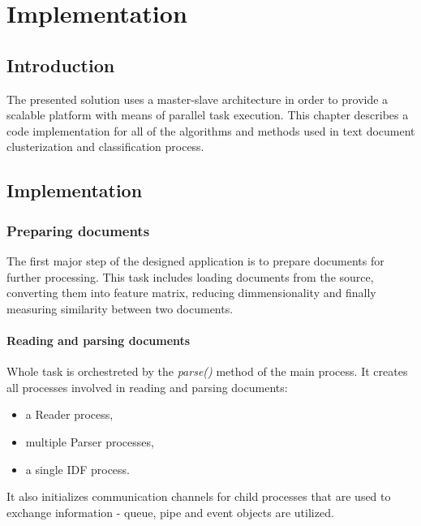 \chapter{Implementation} \label{implementation}

\section{Introduction}
The presented solution uses a master-slave architecture in order to provide a scalable platform with means of parallel task execution. This chapter describes a code implementation for all of the algorithms and methods used in text document clusterization and classification process.


\section{Implementation}
\subsection{Preparing documents}
The first major step of the designed application is to prepare documents for further processing. This task includes loading documents from the source, converting them into feature matrix, reducing dimmensionality and finally measuring similarity between two documents.

\subsubsection{Reading and parsing documents}

Whole task is orchestreted by the \textit{parse()} method of the main process. It creates all processes involved in reading and parsing documents:
\begin{itemize}
\item a Reader process, 
\item multiple Parser processes, 
\item a single IDF process.
\end{itemize}  It also initializes communication channels for child processes that are used to exchange information - queue, pipe and event objects are utilized.

